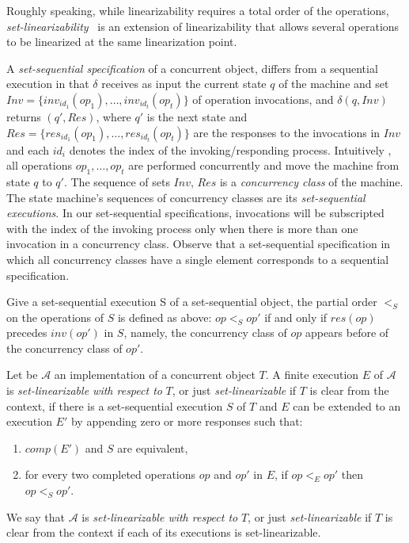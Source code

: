 Roughly speaking, while linearizability requires a total order of the operations, \emph{set-linearizability}~\cite{DBLP_journals_jacm_CastanedaRR18, DBLP_conf_podc_Neiger94} is an extension of linearizability that allows several operations to be linearized at the same linearization point. 

A \emph{set-sequential specification} of a concurrent object, differs from a sequential execution in that \(\delta\) receives as input the current state \(q\) of the machine and set \(Inv = \{inv_{id_1}(op_1), \ldots, inv_{id_t}(op_t)\}\) of operation invocations, and \(\delta(q, Inv)\) returns \((q', Res)\), where \(q'\) is the next state and \(Res = \{res_{id_1}(op_1), \ldots, res_{id_t}(op_t)\}\) are the responses to the invocations in \(Inv\) and each \(id_i\) denotes the index of the invoking/responding process. Intuitively , all operations \(op_1, \ldots, op_t\) are performed concurrently and move the machine from state \(q\) to \(q'\). The sequence of sets \(Inv\), \(Res\) is a \emph{concurrency class} of the machine. The state machine's sequences of concurrency classes are its \emph{set-sequential executions}. In our set-sequential specifications, invocations will be subscripted with the index of the invoking process only when there is more than one invocation in a concurrency class. Observe that a set-sequential specification in which all concurrency classes have a single element corresponds to a sequential specification.

Give a set-sequential execution S of a set-sequential object, the partial order \(<_S\) on the operations of \(S\) is defined as above: \(op <_S op'\) if and only if \(res(op)\) precedes \(inv(op')\) in \(S\), namely, the concurrency class of \(op\) appears before of the concurrency class of \(op'\).


\begin{definition}
    Let be \(\mathcal{A}\) an implementation of a concurrent object \(T\). A finite execution \(E\) of \(\mathcal{A}\) is \emph{set-linearizable with respect to} \(T\), or just \emph{set-linearizable} if \(T\) is clear from the context, if there is a set-sequential execution \(S\) of \(T\) and \(E\) can be extended to an execution \(E'\) by appending zero or more responses such that:

    \begin{enumerate}
        \item \(comp(E')\) and \(S\) are equivalent,
        \item for every two completed operations \(op\) and \(op'\) in \(E\), if \(op <_E op'\) then \(op <_S op'\).
    \end{enumerate}

    We say that \(\mathcal{A}\) is \emph{set-linearizable with respect to} \(T\), or just \emph{set-linearizable} if \(T\) is clear from the context if each of its executions is set-linearizable.
\end{definition}

